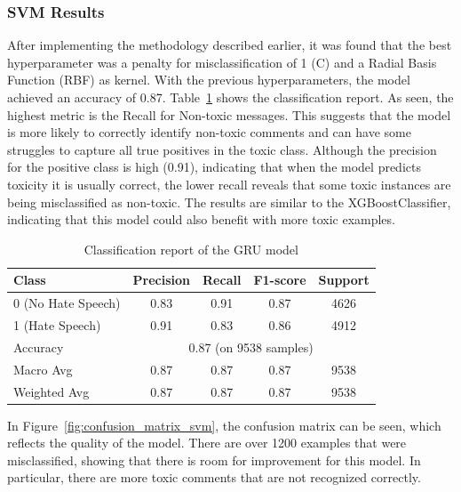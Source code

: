 \subsubsection{SVM Results}
After implementing the methodology described earlier, it was found that the best hyperparameter was a penalty for misclassification of 1 (C) and a Radial Basis Function (RBF) as kernel. With the previous hyperparameters, the model achieved an accuracy of 0.87. 
Table~\ref{tab:gru_classification_report} shows the classification report. As seen, the highest metric is the Recall for Non-toxic messages. This suggests that the model is more likely to correctly identify non-toxic comments and can have some struggles to capture all true positives in the toxic class. Although the precision for the positive class is high (0.91), indicating that when the model predicts toxicity it is usually correct, the lower recall reveals that some toxic instances are being misclassified as non-toxic. The results are similar to the XGBoostClassifier, indicating that this model could also benefit with more toxic examples.

\begin{table}[H]
    \centering
    \caption{Classification report of the GRU model}
    \label{tab:gru_classification_report}
    \begin{tabular}{lcccc}
        \toprule
        Class & Precision & Recall & F1-score & Support \\
        \midrule
        0 (No Hate Speech) & 0.83 & 0.91 & 0.87 & 4626 \\
        1 (Hate Speech)    & 0.91 & 0.83 & 0.86 & 4912 \\
        \midrule
        Accuracy           & \multicolumn{4}{c}{0.87 (on 9538 samples)} \\
        Macro Avg          & 0.87 & 0.87 & 0.87 & 9538 \\
        Weighted Avg       & 0.87 & 0.87 & 0.87 & 9538 \\
        \bottomrule
    \end{tabular}
\end{table}

In Figure~\ref{fig:confusion_matrix_svm}, the confusion matrix can be seen, which reflects the quality of the model. There are over 1200 examples that were misclassified, showing that there is room for improvement for this model. In particular, there are more toxic comments that are not recognized correctly.

